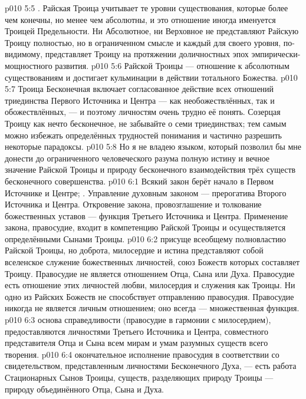 \vs p010 5:5 . Райская Троица учитывает те уровни существования, которые более чем конечны, но менее чем абсолютны, и это отношение иногда именуется Троицей Предельности. Ни Абсолютное, ни Верховное не представляют Райскую Троицу полностью, но в ограниченном смысле и каждый для своего уровня, по\hyp{}видимому, представляет Троицу на протяжении доличностных эпох эмпирически\hyp{}мощностного развития.
\vs p010 5:6  Райской Троицы --- отношение к абсолютным существованиям и достигает кульминации в действии тотального Божества.
\vs p010 5:7 \pc Троица Бесконечная включает согласованное действие всех отношений триединства Первого Источника и Центра --- как необожествлённых, так и обожествлённых, --- и поэтому личностям очень трудно её понять. Созерцая Троицу как нечто бесконечное, не забывайте о семи триединствах; тем самым можно избежать определённых трудностей понимания и частично разрешить некоторые парадоксы.
\vs p010 5:8 \pc Но я не владею языком, который позволил бы мне донести до ограниченного человеческого разума полную истину и вечное значение Райской Троицы и природу бесконечного взаимодействия трёх существ бесконечного совершенства.
\vs p010 6:1 Всякий закон берёт начало в Первом Источнике и Центре; . Управление духовным законом --- прерогатива Второго Источника и Центра. Откровение закона, провозглашение и толкование божественных уставов --- функция Третьего Источника и Центра. Применение закона, правосудие, входит в компетенцию Райской Троицы и осуществляется определёнными Сынами Троицы.
\vs p010 6:2 \pc {} присуще всеобщему полновластию Райской Троицы, но доброта, милосердие и истина представляют собой вселенское служение божественных личностей, союз Божеств которых составляет Троицу. Правосудие не является отношением Отца, Сына или Духа. Правосудие есть отношение этих личностей любви, милосердия и служения как Троицы. Ни одно из Райских Божеств не способствует отправлению правосудия. Правосудие никогда не является личным отношением; оно всегда --- множественная функция.
\vs p010 6:3 \pc {} основа справедливости (правосудие в гармонии с милосердием), предоставляются личностями Третьего Источника и Центра, совместного представителя Отца и Сына всем мирам и умам разумных существ всего творения.
\vs p010 6:4 \pc {} окончательное исполнение правосудия в соответствии со свидетельством, представленным личностями Бесконечного Духа, --- есть работа Стационарных Сынов Троицы, существ, разделяющих природу Троицы --- природу объединённого Отца, Сына и Духа.
